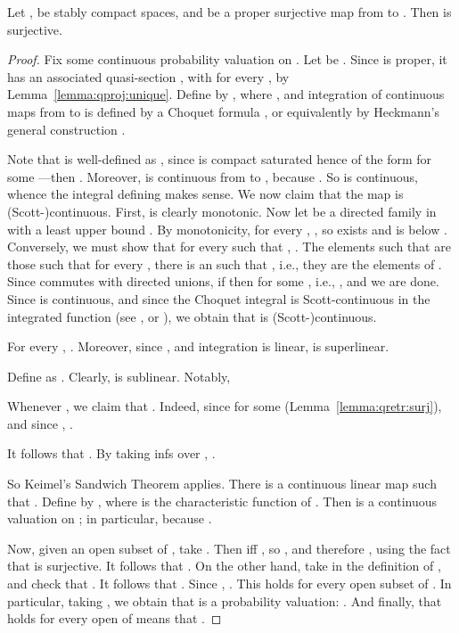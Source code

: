 \documentclass{LMCS}
\begin{document}
\begin{prop}
  \label{prop:qretr:surj}
  Let ,  be stably compact spaces, and  be a proper
  surjective map from  to .  Then  is
  surjective.
\end{prop}
\begin{proof}
  Fix some continuous probability valuation  on .  Let  be
  .  Since  is proper, it has an associated
  quasi-section , with  for every ,
  by Lemma~\ref{lemma:qproj:unique}.  Define  by , where , and integration of continuous maps from  to
   is defined by a Choquet formula
  \cite{Tix:bewertung,JGL-icalp07}, or equivalently by Heckmann's
  general construction \cite{Heckmann:space:val}.

  Note that  is well-defined as , since
   is compact saturated hence of the form 
  for some ---then .  Moreover,  is
  continuous from  to , because .  So  is
  continuous, whence the integral defining  makes sense.  We now
  claim that the map  is (Scott-)continuous.  First,  is clearly monotonic.  Now let  be a
  directed family in  with a least upper bound .
  By monotonicity, for every , , so  exists and is below .
  Conversely, we must show that for every  such that , .  The elements  such that  are those such that for every , there is an  such that ,
  i.e., they are the elements of .  Since  commutes with directed unions, if  then  for some ,
  i.e., , and we are done.  Since  is
  continuous, and since the Choquet integral is Scott-continuous in
  the integrated function (see \cite[Satz~4.4]{Tix:bewertung}, or
  \cite[Theorem~7.1~(3)]{Heckmann:space:val}), we obtain that  is
  (Scott-)continuous.

  For every , .  Moreover, since
  , and integration is linear, 
  is superlinear.

  Define  as .  Clearly,  is
  sublinear.  Notably,
  
  Whenever , we claim that .  Indeed, since  for some 
  (Lemma~\ref{lemma:qretr:surj}), and since , .

  It follows that .  By taking infs over , .

  So Keimel's Sandwich Theorem applies.  There is a continuous linear
  map  such that .
  Define  by , where  is the characteristic function of .
  Then  is a continuous valuation on ; in particular,  because
  .

  Now, given an open subset  of , take .
  Then  iff , so , and therefore , using the fact that
   is surjective.  It follows that .  On the other hand, take  in the
  definition of , and check that .  It follows
  that .  Since
  , .  This holds for every open subset  of .  In
  particular, taking , we obtain that  is a probability
  valuation: .  And
  finally, that  holds for every open
   of  means that .
\end{proof}
\end{document}
